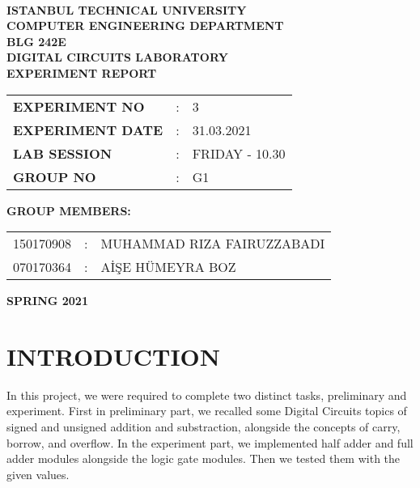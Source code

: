 \documentclass[pdftex,12pt,a4paper]{article}
\begin{document}
\begin{titlepage}
\begin{center}
\textbf{}\\
\textbf{\Large{ISTANBUL TECHNICAL UNIVERSITY}}\\
\vspace{0.5cm}
\textbf{\Large{COMPUTER ENGINEERING DEPARTMENT}}\\
\vspace{2cm}
\textbf{\Large{BLG 242E\\ DIGITAL CIRCUITS LABORATORY\\ EXPERIMENT REPORT}}\\
\vspace{2.8cm}
\begin{table}[ht]
\centering
\Large{
\begin{tabular}{lcl}
\textbf{EXPERIMENT NO}  & : & 3 \\
\textbf{EXPERIMENT DATE}  & : & 31.03.2021 \\
\textbf{LAB SESSION}  & : & FRIDAY - 10.30 \\
\textbf{GROUP NO}  & : & G1 \\
\end{tabular}}
\end{table}
\vspace{1cm}
\textbf{\Large{GROUP MEMBERS:}}\\
\begin{table}[ht]
\centering
\Large{
\begin{tabular}{rcl}
150170908  & : & MUHAMMAD RIZA FAIRUZZABADI \\
070170364  & : & AİŞE HÜMEYRA BOZ \\
\end{tabular}}
\end{table}
\vspace{2.8cm}
\textbf{\Large{SPRING 2021}}

\end{center}

\end{titlepage}

\thispagestyle{empty}
\setcounter{tocdepth}{4}
\tableofcontents
\clearpage

\setcounter{page}{1}

\section{INTRODUCTION}
In this project, we were required to complete two distinct tasks, preliminary and experiment. First in preliminary part, we recalled some Digital Circuits topics of signed and unsigned addition and substraction, alongside the concepts of carry, borrow, and overflow. In the experiment part, we implemented half adder and full adder modules alongside the logic gate modules. Then we tested them with the given values. 
\end{document}
